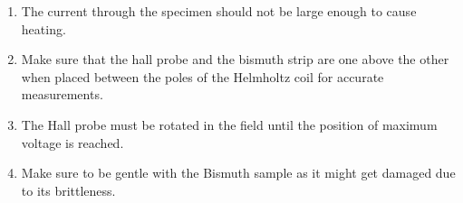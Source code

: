     \begin{enumerate}
        \item The current through the specimen should not be
        large enough to cause heating.
        \item Make sure that the hall probe and the bismuth strip
        are one above the other when placed between the
        poles of the Helmholtz coil for accurate measurements.
        \item The Hall probe must be rotated in the field until
        the position of maximum voltage is reached.
        \item Make sure to be gentle with the Bismuth sample as
        it might get damaged due to its brittleness.
    \end{enumerate}